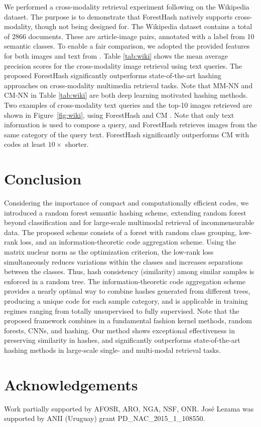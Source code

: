 \documentclass[runningheads]{llncs}
\begin{document}
We performed a cross-modality retrieval experiment following \cite{MM-NN,
  wikixmod} on the Wikipedia dataset.  The purpose is to demonstrate that
ForestHash natively supports cross-modality, though not being designed for.  The Wikipedia dataset contains a
total of 2866 documents. These are article-image pairs, annotated with a label
from 10 semantic classes.  To enable a fair comparison, we adopted the provided
features for both images and text from \cite{wikixmod}.  Table \ref{tab:wiki}
shows the mean average precision scores for the cross-modality image retrieval
using text queries.  The proposed ForestHash significantly outperforms
state-of-the-art hashing approaches on cross-modality multimedia retrieval
tasks. Note that MM-NN and CM-NN \cite{MM-NN} in Table \ref{tab:wiki} are both
deep learning motivated hashing methods.  Two examples of cross-modality text
queries and the top-10 images retrieved are shown in Figure~\ref{fig:wiki},
using ForestHash and CM \cite{wikixmod}.  Note that only text information is
used to compose a query, and ForestHash retrieves images from the same category
of the query text. ForestHash significantly outperforms CM with codes at least
$10 \times$ shorter.


\section{Conclusion} \label{sec:con}
Considering the importance of compact and computationally efficient codes, we
introduced a random forest semantic hashing scheme,
 extending random forest  beyond classification
and for large-scale multimodal retrieval of incommensurable data.  The proposed
scheme consists of a forest with random class grouping, low-rank loss,  and an
information-theoretic code aggregation scheme.  Using the matrix nuclear norm as
the optimization criterion, the low-rank loss simultaneously reduces variations
within the classes and increases separations between the classes.  Thus, hash
consistency (similarity) among similar samples is enforced in a random tree.
The information-theoretic code aggregation scheme provides a nearly optimal way
to combine hashes generated from different trees, producing a unique code for
each sample category, and is applicable in training regimes ranging from totally
unsupervised to fully supervised.  Note that the proposed framework combines in
a fundamental fashion  kernel methods, random forests, CNNs, and
 hashing.  Our method shows exceptional effectiveness in
preserving similarity in hashes, and significantly outperforms state-of-the-art
hashing methods in large-scale single- and multi-modal retrieval tasks.

\section*{Acknowledgements}
Work partially supported by AFOSR, ARO, NGA, NSF, ONR. Jos\'e Lezama was supported by ANII (Uruguay) grant PD\_NAC\_2015\_1\_108550.



\end{document}
